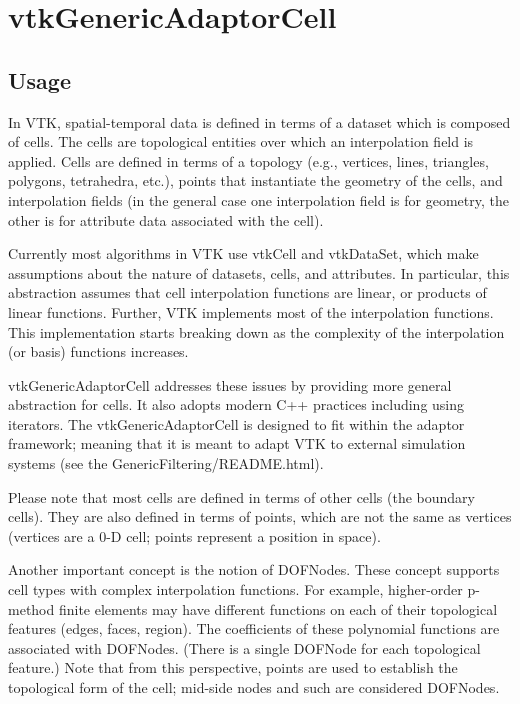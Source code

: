 \section{vtkGenericAdaptorCell}

\subsection{Usage}

 In VTK, spatial-temporal data is defined in terms of a dataset which is
 composed of cells. The cells are topological entities over which an 
 interpolation field is applied. Cells are defined in terms of a topology
 (e.g., vertices, lines, triangles, polygons, tetrahedra, etc.), points
 that instantiate the geometry of the cells, and interpolation fields
 (in the general case one interpolation field is for geometry, the other
 is for attribute data associated with the cell).

 Currently most algorithms in VTK use vtkCell and vtkDataSet, which make 
 assumptions about the nature of datasets, cells, and attributes. In
 particular, this abstraction assumes that cell interpolation functions
 are linear, or products of linear functions. Further, VTK implements
 most of the interpolation functions. This implementation starts breaking
 down as the complexity of the interpolation (or basis) functions
 increases. 

 vtkGenericAdaptorCell addresses these issues by providing more general
 abstraction for cells. It also adopts modern C++ practices including using
 iterators. The vtkGenericAdaptorCell is designed to fit within the adaptor
 framework; meaning that it is meant to adapt VTK to external simulation
 systems (see the GenericFiltering/README.html).

 Please note that most cells are defined in terms of other cells (the
 boundary cells). They are also defined in terms of points, which are
 not the same as vertices (vertices are a 0-D cell; points represent a
 position in space).

 Another important concept is the notion of DOFNodes. These concept
 supports cell types with complex interpolation functions. For example,
 higher-order p-method finite elements may have different functions on each
 of their topological features (edges, faces, region). The coefficients of
 these polynomial functions are associated with DOFNodes. (There is a
 single DOFNode for each topological feature.) Note that from this
 perspective, points are used to establish the topological form of the 
 cell; mid-side nodes and such are considered DOFNodes.

